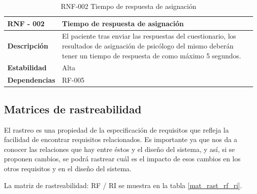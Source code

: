 \begin{table}[htpb]
\centering
\begin{tabularx}{\textwidth}{|l|X|}
\hline
\textbf{RNF - 002}                               & \textbf{Tiempo de respuesta de asignación}                                                                                                                                            \\ \hline
\textbf{Descripción}                             & El paciente tras enviar las respuestas del cuestionario, los resultados de asignación de psicólogo del mismo deberán tener un tiempo de respuesta de como máximo 5 segundos. \\ \hline
\textbf{Estabilidad}                             & Alta                                                                                                                                                                         \\ \hline
\textbf{Dependencias} & RF-005                                                                                                                                                                       \\ \hline
\end{tabularx}
\caption{RNF-002 Tiempo de respuesta de asignación}                                                                                                                                                                                                                                                                      
\end{table}


\subsection{Matrices de rastreabilidad}

El rastreo es una propiedad de la especificación de requisitos que refleja la facilidad de encontrar requisitos relacionados. Es importante ya que nos da a conocer las relaciones que hay entre éstos y el diseño del sistema, y así, si se proponen cambios, se podrá rastrear cuál es el impacto de esos cambios en los otros requisitos y en el diseño del sistema.


La matriz de rastreabilidad: RF / RI se muestra en la tabla \ref{mat_rast_rf_ri}.

